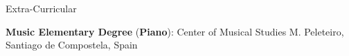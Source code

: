 \documentclass{resume} %
\begin{document}


\begin{mainSection}{Extra-Curricular} \itemsep -14pt
\item\textbf{ Music Elementary Degree} (\textbf{Piano}): Center of Musical Studies M. Peleteiro, Santiago de Compostela, Spain
\end{mainSection}
\end{document}
